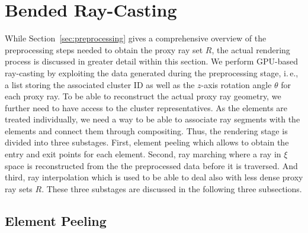 \documentclass[review,journal]{vgtc}         %
\begin{document}
\section{Bended Ray-Casting}\label{sec:rendering}
While Section~\ref{sec:preprocessing} gives a comprehensive overview of the preprocessing steps needed to obtain the proxy ray set $R$, the actual rendering process is discussed in greater detail within this section. We perform GPU-based ray-casting by exploiting the data generated during the preprocessing stage, i.\,e., a list storing the associated cluster ID as well as the $z$-axis rotation angle $\theta$ for each proxy ray. To be able to reconstruct the actual proxy ray geometry, we further need to have access to the cluster representatives. As the elements are treated individually, we need a way to be able to associate ray segments with the elements and connect them through compositing. Thus, the rendering stage is divided into three substages. First, element peeling which allows to obtain the entry and exit points for each element. Second, ray marching where a ray in $\xi$ space is reconstructed from the the preprocessed data before it is traversed. And third, ray interpolation which is used to be able to deal also with less dense proxy ray sets $R$. These three substages are discussed in the following three subsections.


\subsection{Element Peeling}
\end{document}
